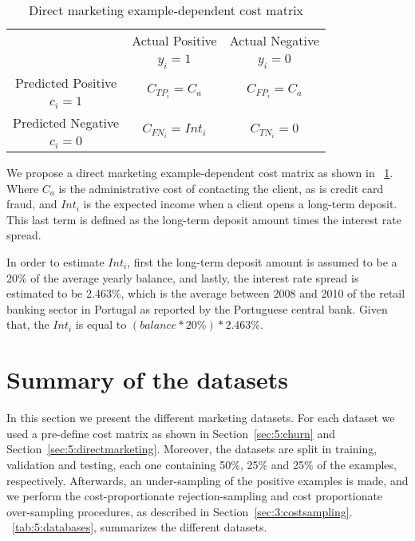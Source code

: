 \begin{table}[b]
  \centering
  \footnotesize
  \begin{tabular}{c|c|c}
    \multicolumn{1}{c|}{}  & Actual Positive& Actual Negative \\
    \multicolumn{1}{c|}{} & $y_i=1$& $y_i=0$ \\
    \hline
    Predicted Positive    & \multirow{ 2}{*}{$C_{TP_i}=C_a$} & \multirow{ 2}{*}{$C_{FP_i}=C_a$} 
    \\
    $c_i=1$ & &\\
    \hline
    Predicted Negative    & \multirow{ 2}{*}{$C_{FN_i}=Int_i$} & \multirow{ 2}{*}{$C_{TN_i}=0$} 
    \\
    $c_i=0$ & &\\
  \end{tabular}
  \caption{Direct marketing example-dependent cost matrix}
  \label{tab:5:d_mat}
\end{table}

We propose a direct marketing example-dependent cost matrix as shown in \mbox{\tablename{ 
\ref{tab:5:d_mat}}}. Where $C_a$ is the administrative cost of contacting the client, as is credit 
card fraud,  and $Int_i$ is the expected income when a client opens a long-term deposit. This last 
term is defined as the long-term deposit amount times the interest rate spread.
 
In order to estimate $Int_i$, first the long-term deposit amount is assumed to be a 20\% of the 
average yearly balance, and lastly, the interest rate spread is estimated to be 2.463\%,  which 
is the average between 2008 and 2010 of the retail banking sector in Portugal as reported by the 
Portuguese central bank. Given that, the $Int_i$ is equal to $\left( balance * 20\% \right) * 
2.463\%$.


\section{Summary of the datasets}

In this section we present the different marketing datasets. 
For each dataset we used a pre-define cost matrix as shown in Section~\ref{sec:5:churn} and 
Section~\ref{sec:5:directmarketing}. Moreover,  the datasets are split in training, validation 
and testing, each one containing 50\%, 25\% and 25\% of the examples, respectively. Afterwards, 
an under-sampling of the positive examples is made, and we perform the 
cost-proportionate rejection-sampling and cost proportionate over-sampling procedures, as described 
in Section~\ref{sec:3:costsampling}. \tablename{~\ref{tab:5:databases}}, 
summarizes the different datasets. 

